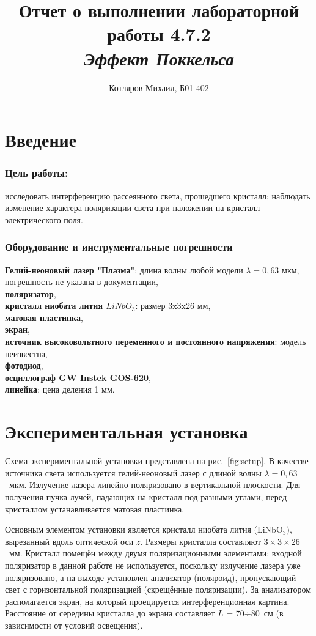 \documentclass[a4paper]{article}
\title{\textbf{Отчет о выполнении лабораторной работы 4.7.2} \\[0.5em] \large\itshape Эффект Поккельса}
\date{}
\author{Котляров Михаил, Б01-402}
\begin{document}
\maketitle
	
\section{Введение}

\subsubsection*{Цель работы:} исследовать интерференцию рассеянного света, прошедшего кристалл; наблюдать изменение характера поляризации света при наложении на кристалл электрического поля.


\subsubsection*{Оборудование и инструментальные погрешности}

\textbf{Гелий-неоновый лазер "Плазма"}: длина волны любой модели $\lambda = 0,63$ мкм, погрешность не указана в документации,\\
\textbf{поляризатор},\\
\textbf{кристалл ниобата лития $LiNbO_3$}: размер 3x3x26 мм,\\
\textbf{матовая пластинка},\\
\textbf{экран},\\
\textbf{источник высоковольтного переменного и постоянного напряжения}: модель неизвестна,\\
\textbf{фотодиод},\\
\textbf{осциллограф GW Instek GOS-620},\\
\textbf{линейка}: цена деления 1 мм.\\


\section{Экспериментальная установка}

Схема экспериментальной установки представлена на рис.~\ref{fig:setup}. В качестве источника света используется гелий-неоновый лазер с длиной волны $\lambda = 0{,}63$~мкм. Излучение лазера линейно поляризовано в вертикальной плоскости. Для получения пучка лучей, падающих на кристалл под разными углами, перед кристаллом устанавливается матовая пластинка.

Основным элементом установки является кристалл ниобата лития (LiNbO$_3$), вырезанный вдоль оптической оси $z$. Размеры кристалла составляют $3 \times 3 \times 26$~мм. Кристалл помещён между двумя поляризационными элементами: входной поляризатор в данной работе не используется, поскольку излучение лазера уже поляризовано, а на выходе установлен анализатор (поляроид), пропускающий свет с горизонтальной поляризацией (скрещённые поляризации). За анализатором располагается экран, на который проецируется интерференционная картина. Расстояние от середины кристалла до экрана составляет $L$ = 70÷80~см (в зависимости от условий освещения).
\end{document}
